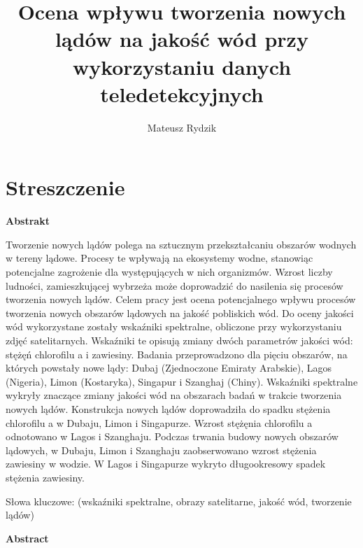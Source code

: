 \documentclass{amuthesis}
\author{Mateusz Rydzik}
\title{Ocena wpływu tworzenia nowych lądów na jakość wód przy
wykorzystaniu danych teledetekcyjnych}
\begin{document}

\titlepage


\hypertarget{streszczenie}{%
\chapter*{Streszczenie}\label{streszczenie}}


\textbf{Abstrakt}

Tworzenie nowych lądów polega na sztucznym przekształcaniu obszarów
wodnych w tereny lądowe. Procesy te wpływają na ekosystemy wodne,
stanowiąc potencjalne zagrożenie dla występujących w nich organizmów.
Wzrost liczby ludności, zamieszkującej wybrzeża może doprowadzić do
nasilenia się procesów tworzenia nowych lądów. Celem pracy jest ocena
potencjalnego wpływu procesów tworzenia nowych obszarów lądowych na
jakość pobliskich wód. Do oceny jakości wód wykorzystane zostały
wskaźniki spektralne, obliczone przy wykorzystaniu zdjęć satelitarnych.
Wskaźniki te opisują zmiany dwóch parametrów jakości wód: stężęń
chlorofilu a i zawiesiny. Badania przeprowadzono dla pięciu obszarów, na
których powstały nowe lądy: Dubaj (Zjednoczone Emiraty Arabskie), Lagos
(Nigeria), Limon (Kostaryka), Singapur i Szanghaj (Chiny). Wskaźniki
spektralne wykryły znaczące zmiany jakości wód na obszarach badań w
trakcie tworzenia nowych lądów. Konstrukcja nowych lądów doprowadziła do
spadku stężenia chlorofilu a w Dubaju, Limon i Singapurze. Wzrost
stężęnia chlorofilu a odnotowano w Lagos i Szanghaju. Podczas trwania
budowy nowych obszarów lądowych, w Dubaju, Limon i Szanghaju
zaobserwowano wzrost stężenia zawiesiny w wodzie. W Lagos i Singapurze
wykryto długookresowy spadek stężenia zawiesiny.

Słowa kluczowe: (wskaźniki spektralne, obrazy satelitarne, jakość wód,
tworzenie lądów)

\textbf{Abstract}
\end{document}
